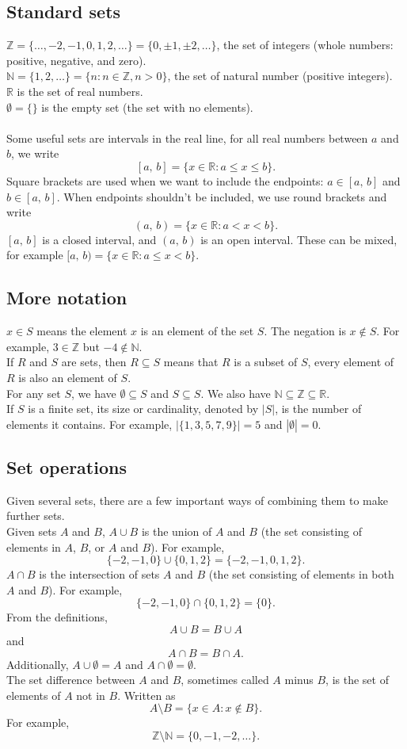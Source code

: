 \documentclass[10pt, a4paper]{article}
\newcommand{\N}{\mathbb{N}}
\newcommand{\Z}{\mathbb{Z}}
\newcommand{\R}{\mathbb{R}}
\begin{document}
\subsection{Standard sets}
$\Z = \{\dotsc, -2, -1, 0, 1, 2, \dotsc\} = \{0, \pm 1, \pm 2, \dotsc\}$, the set of integers (whole numbers: positive, negative, and zero). \\
$\N = \{1, 2, \dotsc\} = \{n: n \in \Z, n > 0\}$, the set of natural number (positive integers). \\
$\R$ is the set of real numbers. \\
$\emptyset = \{\}$ is the empty set (the set with no elements). \\
\\
Some useful sets are intervals in the real line, for all real numbers between $a$ and $b$, we write
\[
[a,\,b] = \{x \in \R : a \leq x \leq b\}.
\]
Square brackets are used when we want to include the endpoints: $a \in [a,\,b]$ and $b \in [a,\,b]$. When endpoints shouldn't be included, we use round brackets and write
\[
(a,\,b) = \{x \in \R : a < x < b\}.
\]
$[a,\,b]$ is a closed interval, and $(a,\,b)$ is an open interval. These can be mixed, for example $[a,\,b) = \{x \in \R : a \leq x < b\}$.

\subsection{More notation}
$x \in S$ means the element $x$ is an element of the set $S$. The negation is $x \notin S$. For example, $3 \in \Z$ but $-4 \notin \N$. \\
If $R$ and $S$ are sets, then $R \subseteq S$ means that $R$ is a subset of $S$, every element of $R$ is also an element of $S$. \\
For any set $S$, we have $\emptyset \subseteq S$ and $S \subseteq S$. We also have $\N \subseteq \Z \subseteq \R$. \\
If $S$ is a finite set, its size or cardinality, denoted by $|S|$, is the number of elements it contains. For example, $|\{1, 3, 5, 7, 9\}| = 5$ and $|\emptyset| = 0$.

\subsection{Set operations}
Given several sets, there are a few important ways of combining them to make further sets. \\
Given sets $A$ and $B$, $A \cup B$ is the union of $A$ and $B$ (the set consisting of elements in $A$, $B$, or $A$ and $B$). For example,
\[
\{-2, -1, 0\} \cup \{0, 1, 2\} = \{-2, -1, 0, 1, 2\}.
\]
$A \cap B$ is the intersection of sets $A$ and $B$ (the set consisting of elements in both $A$ and $B$). For example,
\[
\{-2, -1, 0\} \cap \{0, 1, 2\} = \{0\}.
\]
From the definitions,
\[
A \cup B = B \cup A
\]
and
\[
A \cap B = B \cap A.
\]
Additionally, $A \cup \emptyset = A$ and $A \cap \emptyset = \emptyset$. \\
The set difference between $A$ and $B$, sometimes called $A$ minus $B$, is the set of elements of $A$ not in $B$. Written as
\[
A \setminus B = \{x \in A : x \notin B\}.
\]
For example,
\[
\Z \setminus \N = \{0, -1, -2, \dotsc\}.
\]
\end{document}
